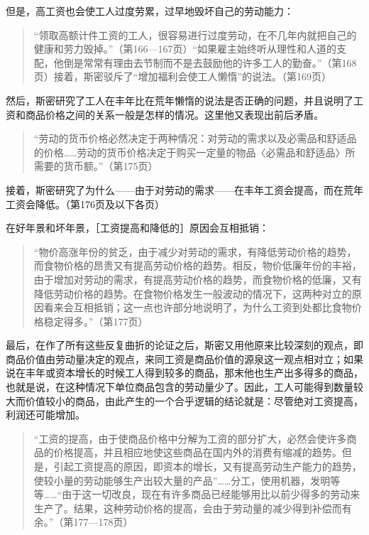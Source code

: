 但是，高工资也会使工人过度劳累，过早地毁坏自己的劳动能力：

\begin{quote}{“领取高额计件工资的工人，很容易进行过度劳动，在不几年内就把自己的健康和劳力毁掉。”（第166—167页）“如果雇主始终听从理性和人道的支配，他倒是常常有理由去节制而不是去鼓励他的许多工人的勤奋。”（第168页）接着，斯密驳斥了“增加福利会使工人懒惰”的说法。（第169页）}\end{quote}

然后，斯密研究了工人在丰年比在荒年懒惰的说法是否正确的问题，并且说明了工资和商品价格之间的关系一般是怎样的情况。这里他又表现出前后矛盾。

\begin{quote}{“劳动的货币价格必然决定于两种情况：对劳动的需求以及必需品和舒适品的价格……劳动的货币价格决定于购买一定量的物品〈必需品和舒适品〉所需要的货币额。”（第175页）}\end{quote}

接着，斯密研究了为什么——由于对劳动的需求——在丰年工资会提高，而在荒年工资会降低。（第176页及以下各页）

在好年景和坏年景，［工资提高和降低的］原因会互相抵销：

\begin{quote}{“物价高涨年份的贫乏，由于减少对劳动的需求，有降低劳动价格的趋势，而食物价格的昂贵又有提高劳动价格的趋势。相反，物价低廉年份的丰裕，由于增加对劳动的需求，有提高劳动价格的趋势，而食物价格的低廉，又有降低劳动价格的趋势。在食物价格发生一般波动的情况下，这两种对立的原因看来会互相抵销；这一点也许部分地说明了，为什么工资到处都比食物价格稳定得多。”（第177页）}\end{quote}

最后，在作了所有这些反复曲折的论证之后，斯密又用他原来比较深刻的观点，即商品价值由劳动量决定的观点，来同工资是商品价值的源泉这一观点相对立；如果说在丰年或资本增长的时候工人得到较多的商品，那末他也生产出多得多的商品，也就是说，在这种情况下单位商品包含的劳动量少了。因此，工人可能得到数量较大而价值较小的商品，由此产生的一个合乎逻辑的结论就是：尽管绝对工资提高，利润还可能增加。

\begin{quote}{“工资的提高，由于使商品价格中分解为工资的部分扩大，必然会使许多商品的价格提高，并且相应地使这些商品在国内外的消费有缩减的趋势。但是，引起工资提高的原因，即资本的增长，又有提高劳动生产能力的趋势，使较小量的劳动能够生产出较大量的产品”……分工，使用机器，发明等等……“由于这一切改良，现在有许多商品已经能够用比以前少得多的劳动来生产了。结果，这种劳动价格的提高，会由于劳动量的减少得到补偿而有余。”（第177—178页）}\end{quote}


